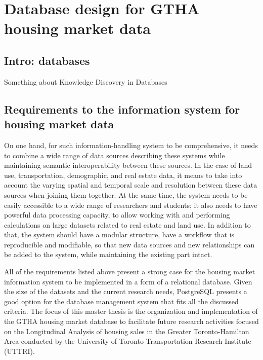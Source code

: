 \chapter{Database design for GTHA housing market data} \label{ch:database_design_for_gtha_housing_market_data}

\section{Intro: databases} \label{sec:intro_database_design}

Something about Knowledge Discovery in Databases

\section{Requirements to the information system for housing market data} \label{sec:requirements_to_information_system}

On one hand, for such information-handling system to be comprehensive, it needs to combine a wide range of data sources describing these systems while maintaining semantic interoperability between these sources.
In the case of land use, transportation, demographic, and real estate data, it means to take into account the varying spatial and temporal scale and resolution between these data sources when joining them together.
At the same time, the system needs to be easily accessible to a wide range of researchers and students;
it also needs to have powerful data processing capacity, to allow working with and performing calculations on large datasets related to real estate and land use.
In addition to that, the system should have a modular structure, have a workflow that is reproducible and modifiable, so that new data sources and new relationships can be added to the system, while maintaining the existing part intact.

All of the requirements listed above present a strong case for the housing market information system to be implemented in a form of a relational database.
Given the size of the datasets and the current research needs, PostgreSQL presents a good option for the database management system that fits all the discussed criteria.
The focus of this master thesis is the organization and implementation of the GTHA housing market database to facilitate future research activities focused on the Longitudinal Analysis of housing sales in the Greater Toronto-Hamilton Area conducted by the University of Toronto Transportation Research Institute (UTTRI).

